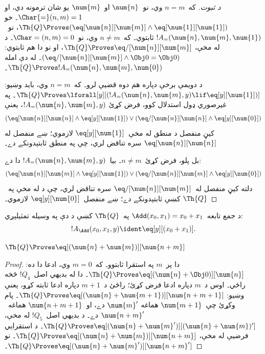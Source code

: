 \documentclass[../../../include/open-logic-section]{subfiles}
\begin{document}
\begin{proof}[د  ثبوت]
که~$n = m$ وي، نو~$\num{n}$ او~$\num{m}$ يو شان ترمونه دي، او
$\Char{=}(n, m) = 1$۔ خو $\Th{Q} \Proves (\eq[\num{n}][\num{m}] \land
\eq[\num{1}][\num{1}])$، نو~$!A_=(\num{n}, \num{m},
\num{1})$ ثابتوي۔ که~$n \neq m$ وي، نو~$\Char=(n, m) = 0$۔ د
 له مخې،
$\Th{Q} \Proves \eq/[\num{n}][\num{m}]$، او نو دا هم ثابتوي:
$(\eq/[\num{n}][\num{m}] \land \Obj 0 = \Obj 0)$۔ له دې امله
$\Th{Q} \Proves !A_=(\num{n}, \num{m}, \num{0})$۔

د دويمې برخې دپاره هم دوه قضيې لرو۔ که~$n = m$ وي، بايد وښيو:
$\Th{Q} \Proves \lforall[y][(!A_=(\num{n}, \num{m}, y)
  \lif \eq[y][\num{1}])]$۔ په غيرصوري ډول استدلال کوو، فرض کړئ
$!A_=(\num{n}, \num{m}, y)$، يعنې
\[
(\eq[\num{n}][\num{n}] \land \eq[y][\num{1}]) \lor
(\eq/[\num{n}][\num{n}] \land \eq[y][\num{0}])
\]
کيڼ منفصل د منطق له مخې~$\eq[y][\num{1}]$ لازموي؛ ښے منفصل له
$\eq[\num{n}][\num{n}]$ سره تناقض لري، چې په منطق ثابتېدونکے دے۔

بل پلو، فرض کړئ~$n \neq m$۔ بيا~$!A_=(\num{n},
\num{m}, y)$ دا دے:
\[
(\eq[\num{n}][\num{m}] \land \eq[y][\num{1}]) \lor
(\eq/[\num{n}][\num{m}] \land \eq[y][\num{0}])
\]
دلته کيڼ منفصل له~$\eq/[\num{n}][\num{m}]$ سره تناقض لري، چې د
 له مخې په~$\Th{Q}$ کښې ثابتېدونکے دے؛ ښے
منفصل~$\eq[y][\num{0}]$ لازموي۔
\end{proof}

\begin{prop}
د جمع تابعه~$\Add(x_0, x_1) = x_0+x_1$ په~$\Th{Q}$ کښې د دې په
وسيله تمثيلېږي:
\[
  !A_{\Add}(x_0, x_1, y) \ident \eq[y][(x_0 + x_1)].
\]
\end{prop}

\begin{lem}
$\Th{Q} \Proves \eq[(\num{n} + \num{m})][\num{n+m}]$
\end{lem}

\begin{proof}
دا پر~$m$ په استقرا ثابتوو۔ که~$m = 0$ وي، ادعا دا ده:
$\Th{Q} \Proves \eq[(\num{n} + \Obj 0)][\num{n}]$۔ دا له بديهي
اصل~$!Q_4$ څخه راځي۔ اوس د~$m$ دپاره ادعا فرض کړئ؛ راځئ د~$m+1$
دپاره ادعا ثابته کړو، يعنې وښيو:
$\Th{Q} \Proves \eq[(\num{n} +
  \num{m+1})][\num{n+m+1}]$۔ پام وکړئ چې~$\num{m+1}$ هماغه
$\num{m}'$ دے، او~$\num{n+m+1}$ هماغه~$\num{n+m}'$ دے۔ د بديهي
اصل~$!Q_5$ له مخې، $\Th{Q} \Proves
\eq[(\num{n} + \num{m}')][(\num{n}+\num{m})']$۔ د استقرايي فرضيې
له مخې، $\Th{Q} \Proves
\eq[(\num{n} + \num{m})][\num{n+m}]$۔ نو
$\Th{Q} \Proves \eq[(\num{n} + \num{m}')][\num{n+m}']$۔
\end{proof}
\end{document}
